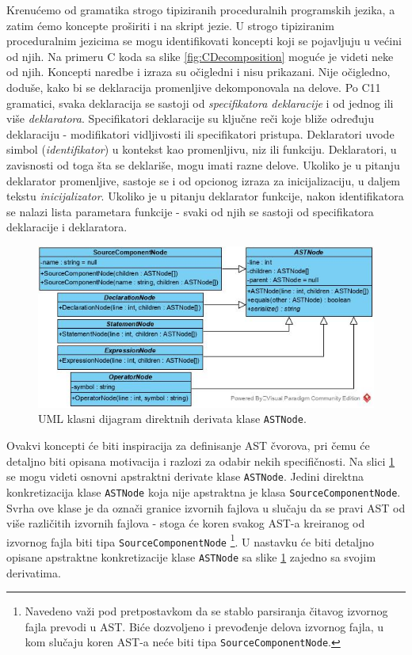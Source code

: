 Krenućemo od gramatika strogo tipiziranih proceduralnih programskih jezika, a zatim ćemo koncepte proširiti i na skript jezie. U strogo tipiziranim proceduralnim jezicima se mogu identifikovati koncepti koji se pojavljuju u većini od njih. Na primeru C koda sa slike \ref{fig:CDecomposition} moguće je videti neke od njih. Koncepti naredbe i izraza su očigledni i nisu prikazani. Nije očigledno, doduše, kako bi se deklaracija promenljive dekomponovala na delove. Po C11 gramatici, svaka deklaracija se sastoji od \emph{specifikatora deklaracije} i od jednog ili više \emph{deklaratora}. Specifikatori deklaracije su ključne reči koje bliže određuju deklaraciju - modifikatori vidljivosti ili specifikatori pristupa. Deklaratori uvode simbol (\emph{identifikator}) u kontekst kao promenljivu, niz ili funkciju. Deklaratori, u zavisnosti od toga šta se deklariše, mogu imati razne delove. Ukoliko je u pitanju deklarator promenljive, sastoje se i od opcionog izraza za inicijalizaciju, u daljem tekstu \emph{inicijalizator}. Ukoliko je u pitanju deklarator funkcije, nakon identifikatora se nalazi lista parametara funkcije - svaki od njih se sastoji od specifikatora deklaracije i deklaratora.

\begin{figure}[h!]
    \centering
        \includegraphics[scale=0.7]{images/uml/ASTNode.jpg}
    \caption{UML klasni dijagram direktnih derivata klase \texttt{ASTNode}.}
    \label{fig:UMLASTNode}
\end{figure}

Ovakvi koncepti će biti inspiracija za definisanje AST čvorova, pri čemu će detaljno biti opisana motivacija i razlozi za odabir nekih specifičnosti. Na slici \ref{fig:UMLASTNode} se mogu videti osnovni apstraktni derivate klase \texttt{ASTNode}. Jedini direktna konkretizacija klase \texttt{ASTNode} koja nije apstraktna je klasa \texttt{SourceComponentNode}. Svrha ove klase je da označi granice izvornih fajlova u slučaju da se pravi AST od više različitih izvornih fajlova - stoga će koren svakog AST-a kreiranog od izvornog fajla biti tipa \texttt{SourceComponentNode} \footnote{Navedeno važi pod pretpostavkom da se stablo parsiranja čitavog izvornog fajla prevodi u AST. Biće dozvoljeno i prevođenje delova izvornog fajla, u kom slučaju koren AST-a neće biti tipa \texttt{SourceComponentNode}.}. U nastavku će biti detaljno opisane apstraktne konkretizacije klase \texttt{ASTNode} sa slike \ref{fig:UMLASTNode} zajedno sa svojim derivatima. 
\endif